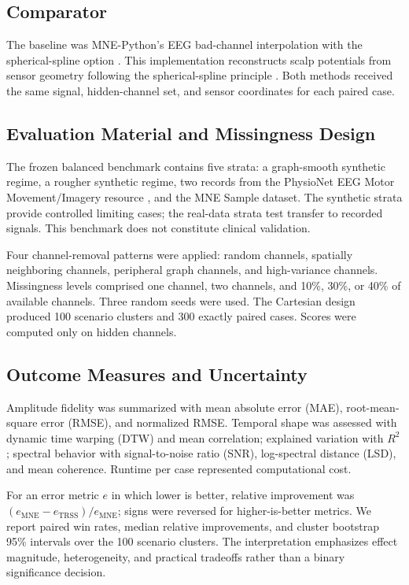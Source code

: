 \subsection{Comparator}
The baseline was MNE-Python's EEG bad-channel interpolation with the spherical-spline option \cite{gramfort2013meg,gramfort2014mne}. This implementation reconstructs scalp potentials from sensor geometry following the spherical-spline principle \cite{perrin1989}. Both methods received the same signal, hidden-channel set, and sensor coordinates for each paired case.

\subsection{Evaluation Material and Missingness Design}
The frozen balanced benchmark contains five strata: a graph-smooth synthetic regime, a rougher synthetic regime, two records from the PhysioNet EEG Motor Movement/Imagery resource \cite{goldberger2000physiobank,schalk2004bci2000}, and the MNE Sample dataset. The synthetic strata provide controlled limiting cases; the real-data strata test transfer to recorded signals. This benchmark does not constitute clinical validation.

Four channel-removal patterns were applied: random channels, spatially neighboring channels, peripheral graph channels, and high-variance channels. Missingness levels comprised one channel, two channels, and 10\%, 30\%, or 40\% of available channels. Three random seeds were used. The Cartesian design produced 100 scenario clusters and 300 exactly paired cases. Scores were computed only on hidden channels.

\subsection{Outcome Measures and Uncertainty}
Amplitude fidelity was summarized with mean absolute error (MAE), root-mean-square error (RMSE), and normalized RMSE. Temporal shape was assessed with dynamic time warping (DTW) and mean correlation; explained variation with $R^2$; spectral behavior with signal-to-noise ratio (SNR), log-spectral distance (LSD), and mean coherence. Runtime per case represented computational cost.

For an error metric $e$ in which lower is better, relative improvement was $(e_{\mathrm{MNE}}-e_{\mathrm{TRSS}})/e_{\mathrm{MNE}}$; signs were reversed for higher-is-better metrics. We report paired win rates, median relative improvements, and cluster bootstrap 95\% intervals over the 100 scenario clusters. The interpretation emphasizes effect magnitude, heterogeneity, and practical tradeoffs rather than a binary significance decision.